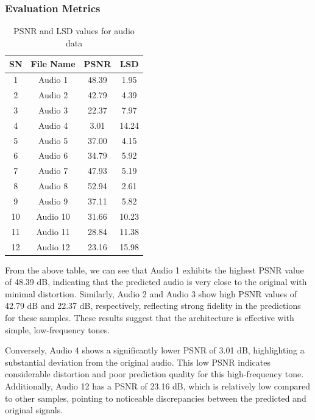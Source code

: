 \documentclass{ioereport}
\begin{document}
    \subsubsection{Evaluation Metrics}
    \begin{table}[H]
    \caption{PSNR and LSD values for audio data}
    \centering
    \begin{tabular}{|c|c|c|c|}
        \hline
        \textbf{SN} & \textbf{File Name} & \textbf{PSNR} & \textbf{LSD} \\
        \hline
        1  & Audio 1 & 48.39 & 1.95  \\
        \hline
        2  & Audio 2 & 42.79 & 4.39  \\
        \hline
        3  & Audio 3 & 22.37 & 7.97  \\
        \hline
        4  & Audio 4 & 3.01  & 14.24 \\
        \hline
        5  & Audio 5 & 37.00 & 4.15  \\
        \hline
        6  & Audio 6 & 34.79 & 5.92  \\
        \hline
        7  & Audio 7 & 47.93 & 5.19  \\
        \hline
        8  & Audio 8 & 52.94 & 2.61  \\
        \hline
        9  & Audio 9 & 37.11 & 5.82  \\
        \hline
        10 & Audio 10 & 31.66 & 10.23 \\
        \hline
        11 & Audio 11 & 28.84 & 11.38 \\
        \hline
        12 & Audio 12 & 23.16 & 15.98 \\
        \hline
    \end{tabular}
    \label{tab:audio_metrics_ordered}
\end{table}

From the above table, we can see that Audio 1 exhibits the highest PSNR value of 48.39 dB, indicating that the predicted audio is very close to the original with minimal distortion. Similarly, Audio 2 and Audio 3 show high PSNR values of 42.79 dB and 22.37 dB, respectively, reflecting strong fidelity in the predictions for these samples. These results suggest that the architecture is effective with simple, low-frequency tones.

Conversely, Audio 4 shows a significantly lower PSNR of 3.01 dB, highlighting a substantial deviation from the original audio. This low PSNR indicates considerable distortion and poor prediction quality for this high-frequency tone. Additionally, Audio 12 has a PSNR of 23.16 dB, which is relatively low compared to other samples, pointing to noticeable discrepancies between the predicted and original signals.
\end{document}
